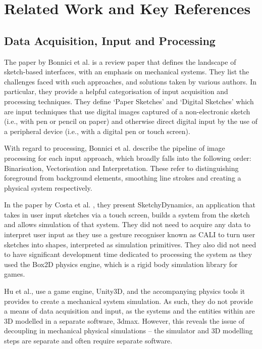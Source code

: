 \documentclass[11pt]{article}
\begin{document}
\pagebreak
\section{Related Work and Key References}
\label{subsec:Related Work and Key References}

\subsection{Data Acquisition, Input and Processing}
\label{subsec:Data Acquisition, Input and Processing}

The paper by Bonnici et al. \cite{101017S} is a review paper that defines the landscape of sketch-based
interfaces, with an emphasis on mechanical systems. They list the challenges faced with such approaches,
and solutions taken by various authors. In particular, they provide a helpful categorisation of input acquisition
and processing techniques. They define `Paper Sketches' and `Digital Sketches' which are input techniques that
use digital images captured of a non-electronic sketch (i.e., with pen or pencil on paper) and otherwise
direct digital input by the use of a peripheral device (i.e., with a digital pen or touch screen).

With regard to processing, Bonnici et al. describe the pipeline of image processing for each input approach, which
broadly falls into the following order: Binarisation, Vectorisation and Interpretation. These refer to distinguishing
foreground from background elements, smoothing line strokes and creating a physical system respectively.

In the paper by Costa et al. \cite{109781I}, they present SketchyDynamics, an application that takes in
user input sketches via a touch screen, builds a system from the sketch and allows simulation of that system.
They did not need to acquire any data to interpret user input as they use a gesture recogniser known as CALI
to turn user sketches into shapes, interpreted as simulation primitives. They also did not need to have significant
development time dedicated to processing the system as they used the Box2D physics engine, which is a rigid
body simulation library for games.

Hu et al., \cite{6274802} use a game engine, Unity3D, and the accompanying physics tools it provides to create a
mechanical system simulation. As such, they do not provide a means of data acquisition and input, as the systems
and the entities within are 3D modelled in a separate software, 3dmax. However, this reveals the issue of decoupling in
mechanical physical simulations -- the simulator and 3D modelling steps are separate and often require separate software.
\end{document}
